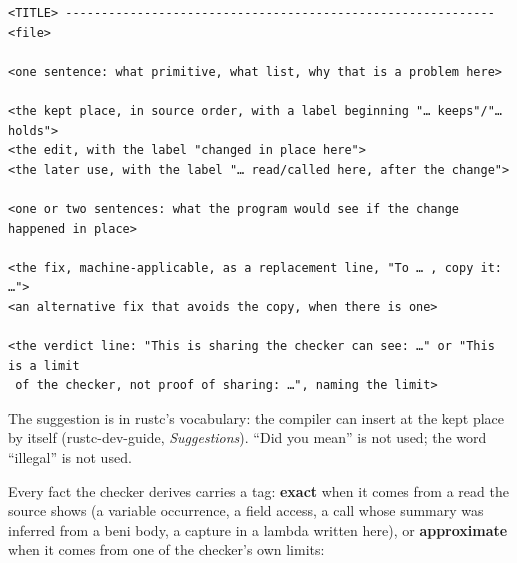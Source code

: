 
\begin{Verbatim}
<TITLE> ------------------------------------------------------------ <file>

<one sentence: what primitive, what list, why that is a problem here>

<the kept place, in source order, with a label beginning "… keeps"/"… holds">
<the edit, with the label "changed in place here">
<the later use, with the label "… read/called here, after the change">

<one or two sentences: what the program would see if the change happened in place>

<the fix, machine-applicable, as a replacement line, "To … , copy it: …">
<an alternative fix that avoids the copy, when there is one>

<the verdict line: "This is sharing the checker can see: …" or "This is a limit
 of the checker, not proof of sharing: …", naming the limit>
\end{Verbatim}

The suggestion is  in rustc's vocabulary: the compiler can insert  at the kept place by itself (rustc-dev-guide, \emph{Suggestions}). “Did you mean” is not used; the word “illegal” is not used.


Every fact the checker derives carries a tag: \textbf{exact} when it comes from a read the source shows (a variable occurrence, a field access, a call whose summary was inferred from a beni body, a capture in a lambda written here), or \textbf{approximate} when it comes from one of the checker's own limits:

